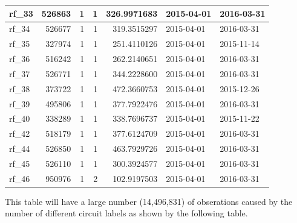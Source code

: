 \documentclass[]{article}
\begin{document}
\begin{table}
\begin{tabular}[t]{l|r|r|r|r|l|l}
\hline
rf\_33 & 526863 & 1 & 1 & 326.9971683 & 2015-04-01 & 2016-03-31\\
\hline
rf\_34 & 526677 & 1 & 1 & 319.3515297 & 2015-04-01 & 2016-03-31\\
\hline
rf\_35 & 327974 & 1 & 1 & 251.4110126 & 2015-04-01 & 2015-11-14\\
\hline
rf\_36 & 516242 & 1 & 1 & 262.2140651 & 2015-04-01 & 2016-03-31\\
\hline
rf\_37 & 526771 & 1 & 1 & 344.2228600 & 2015-04-01 & 2016-03-31\\
\hline
rf\_38 & 373722 & 1 & 1 & 472.3660753 & 2015-04-01 & 2015-12-26\\
\hline
rf\_39 & 495806 & 1 & 1 & 377.7922476 & 2015-04-01 & 2016-03-31\\
\hline
rf\_40 & 338289 & 1 & 1 & 338.7696737 & 2015-04-01 & 2015-11-22\\
\hline
rf\_42 & 518179 & 1 & 1 & 377.6124709 & 2015-04-01 & 2016-03-31\\
\hline
rf\_44 & 526850 & 1 & 1 & 463.7929726 & 2015-04-01 & 2016-03-31\\
\hline
rf\_45 & 526110 & 1 & 1 & 300.3924577 & 2015-04-01 & 2016-03-31\\
\hline
rf\_46 & 950976 & 1 & 2 & 102.9197503 & 2015-04-01 & 2016-03-31\\
\hline
\end{tabular}
\end{table}

This table will have a large number (14,496,831) of obserations caused
by the number of different circuit labels as shown by the following
table.
\end{document}
